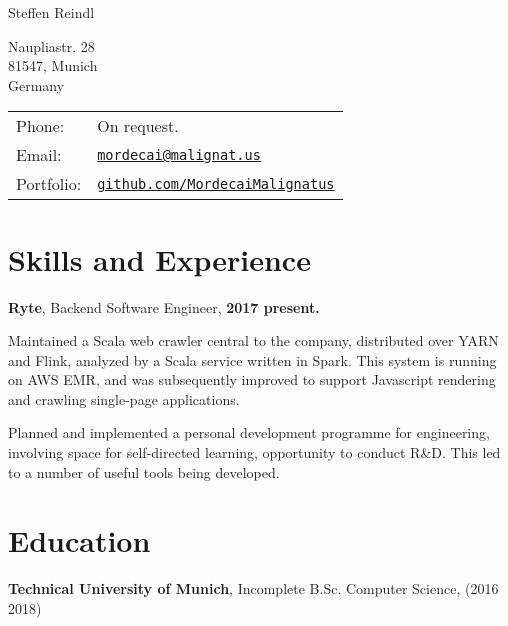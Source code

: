 \documentclass[a4paper]{article}
\def\name{Steffen Reindl}
\renewenvironment{itemize}{
  \begin{list}{}{
      \setlength{\leftmargin}{1.5em}
      \setlength{\itemsep}{10pt}
  }
}{
  \end{list}
}
\begin{document}
{\huge \name}
\vspace{0.25in}

\begin{minipage}{0.45\linewidth}
  Naupliastr. 28\\
  81547, Munich\\
  Germany
\end{minipage}
\begin{minipage}{0.45\linewidth}
  \begin{tabular}{ll}
    Phone: & On request. \\
    Email: & \href{mailto:mordecai@malignat.us}{\tt mordecai@malignat.us} \\
    Portfolio: & \href{https://github.com/MordecaiMalignatus/}{\tt github.com/MordecaiMalignatus}
  \end{tabular}
\end{minipage}

\section*{Skills and Experience}

\begin{itemize}
\item \textbf{Ryte}, Backend Software Engineer, \textbf{2017 {\textendash} present.}
        \begin{itemize}
            \item Maintained a Scala web crawler central to the company,
              distributed over YARN and Flink, analyzed by a Scala service
              written in Spark. This system is running on AWS EMR, and was
              subsequently improved to support Javascript rendering and crawling
              single-page applications.
            \item Planned and implemented a personal development programme for
              engineering, involving space for self-directed learning,
              opportunity to conduct R\&D. This led to a number of useful tools
              being developed.
        \end{itemize}
\end{itemize}

\section*{Education}

\begin{itemize}
  \item \textbf{Technical University of Munich}, Incomplete B.Sc. Computer Science,  (2016
    {\textendash} 2018)
\end{itemize}
\end{document}
